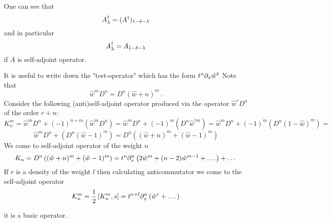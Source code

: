One can see that 
       $$
     A_\lambda^\dagger = (A^\dagger)_{1-\delta-\lambda} 
       $$
and in particular 
         $$
          A_\lambda^\dagger=A_{1-\delta-\lambda}
         $$
if $A$ is self-adjoint operator.

\bigskip


It is useful to write down the "test-operator" which has the form $t^n\partial_x\hat w^k$
   Note that 
               $$
            \hat w^m D^n=D^n(\hat w+n)^m\,.   
               $$
  Consider the following (anti)self-adjoint operator produced via the operator $\hat w^r D^n$ of the order $r+n$:
              $$
     K_n^m=\hat w^m D^n+(-1)^{n+m}\left(\hat w^m D^n\right)=
     \hat w^m D^n+(-1)^m\left(D^n\hat w^{\dagger m}\right)=
     \hat w^m D^n+(-1)^m\left(D^n\left(1-\hat w\right)^m\right)=
              $$
             $$
             \hat w^m D^n+\left(D^n\left(\hat w-1\right)^m\right)=
             D^n\left(
             \left(\hat w+n\right)^m+(\hat w-1)^m
             \right)
             $$
We come to self-adjoint operator of the weight $n$
              $$
   K_n=D^n\left((\hat w+n)^m+(\hat w-1)^m\right)=t^n\partial_x^n
   \left(2\hat w^m+(n-2)\hat w^{m-1}+\dots
   \right)+\dots
                  $$
                  If $r$ is a density of the weight $l$ then calculating anticommutator
                  we come to the self-adjoint operator
                $$
   {\cal K}_n^{m}={1\over 2}\left[K_n^m, s\right]=t^{n+l}\partial_x^n \left(\hat w^r+\dots\right)             
                $$           

it is a basic operator.
\bye
